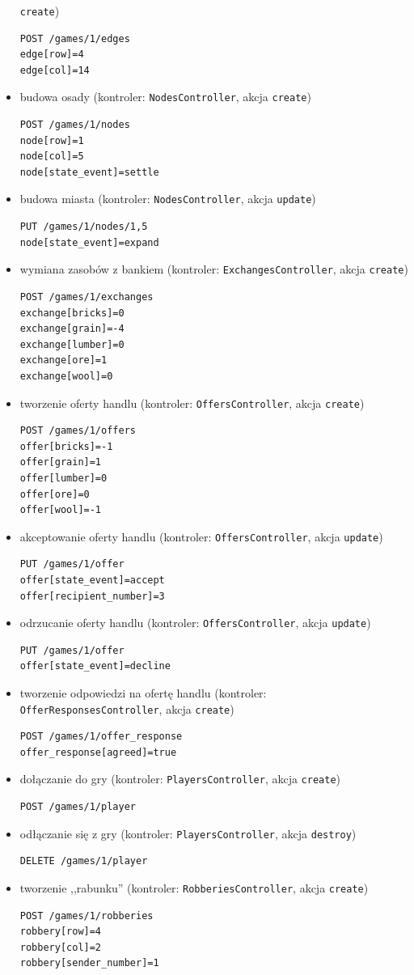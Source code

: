 \documentclass[a4paper,12pt]{article}
\begin{document}
\begin{itemize}
  \texttt{create})
\begin{verbatim}
POST /games/1/edges
edge[row]=4
edge[col]=14
\end{verbatim}
\item budowa osady (kontroler: \texttt{NodesController}, akcja
  \texttt{create})
\begin{verbatim}
POST /games/1/nodes
node[row]=1
node[col]=5
node[state_event]=settle
\end{verbatim}
\item budowa miasta (kontroler: \texttt{NodesController}, akcja
  \texttt{update})
\begin{verbatim}
PUT /games/1/nodes/1,5
node[state_event]=expand
\end{verbatim}
\item wymiana zasobów z bankiem (kontroler: \texttt{ExchangesController}, akcja
  \texttt{create})
\begin{verbatim}
POST /games/1/exchanges
exchange[bricks]=0
exchange[grain]=-4
exchange[lumber]=0
exchange[ore]=1
exchange[wool]=0
\end{verbatim}
\item tworzenie oferty handlu (kontroler: \texttt{OffersController},
  akcja \texttt{create})
\begin{verbatim}
POST /games/1/offers
offer[bricks]=-1
offer[grain]=1
offer[lumber]=0
offer[ore]=0
offer[wool]=-1
\end{verbatim}
\item akceptowanie oferty handlu (kontroler:
  \texttt{OffersController}, akcja \texttt{update})
\begin{verbatim}
PUT /games/1/offer
offer[state_event]=accept
offer[recipient_number]=3
\end{verbatim}
\item odrzucanie oferty handlu (kontroler: \texttt{OffersController},
  akcja \texttt{update})
\begin{verbatim}
PUT /games/1/offer
offer[state_event]=decline
\end{verbatim}
\item tworzenie odpowiedzi na ofertę handlu (kontroler:
  \texttt{OfferResponsesController}, akcja \texttt{create})
\begin{verbatim}
POST /games/1/offer_response
offer_response[agreed]=true
\end{verbatim}
\item dołączanie do gry (kontroler: \texttt{PlayersController}, akcja
  \texttt{create})
\begin{verbatim}
POST /games/1/player
\end{verbatim}
\item odłączanie się z gry (kontroler: \texttt{PlayersController}, akcja
  \texttt{destroy})
\begin{verbatim}
DELETE /games/1/player
\end{verbatim}
\item tworzenie ,,rabunku'' (kontroler: \texttt{RobberiesController}, akcja
  \texttt{create})
\begin{verbatim}
POST /games/1/robberies
robbery[row]=4
robbery[col]=2
robbery[sender_number]=1
\end{verbatim}
\end{itemize}
\end{document}
